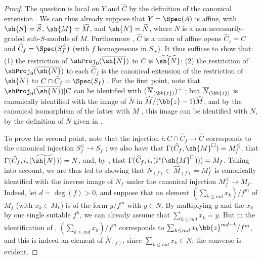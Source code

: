 \begin{proof}
\label{proof-II.8.13.3}
The question is local on $Y$ and $\widehat{C}$ by the definition of the canonical extension .
We can thus already suppose that $Y=\Spec(A)$ is affine, with $\sh{S}=\widetilde{S}$, $\sh{M}=\widetilde{M}$, and $\sh{N}=\widetilde{N}$, where $N$ is a non-necessarily-graded sub-$S$-module of $M$.
Furthermore , $\widehat{C}$ is a union of affine opens $\widehat{C}_z=C$ and $\widehat{C}_f=\Spec(S_f^\leq)$ (with $f$ homogeneous in $S_+$).
It thus suffices to show that: (1) the restriction of $\shProj_0(\overline{\sh{N}})$ to $C$ is $\widetilde{\sh{N}}$; (2) the restriction of $\shProj_0(\overline{\sh{N}})$ to each $\widehat{C}_f$ is the canonical extension of the restriction of $\sh{N}$ to $C\cap\widehat{C}_f=\Spec(S_f)$ .
For the first point, note that $\shProj_0(\overline{\sh{N}})|C$ can be identified with $(\overline{N}_{(\bb{z})})^\sim$ ;
but $\overline{N}_{(\bb{z})}$ is canonically identified  with the image of $\overline{N}$ in $\widehat{M}/(\bb{z}-1)\widehat{M}$, and by the canonical isomorphism of the latter with $M$ , this image can be identified with $N$, by the definition of $\overline{N}$ given in .

To prove the second point, note that the injection $i:C\cap\widehat{C}_f\to\widehat{C}$ corresponds to the canonical injection $S_f^\leq\to S_f$ ;
we also have that $\Gamma(\widehat{C}_f,\sh{M}^\square)=M_f^\leq$, that $\Gamma(\widehat{C}_f,i_*(\widetilde{\sh{N}}))=N$, and, by , that $\Gamma(\widehat{C}_f,i_*(i^*(\sh{M}^\square)))=M_f$.
Taking  into account, we are thus led to showing that $\overline{N}_{(f)}\subset\widehat{M}_{(f)}=M_f^\leq$ is canonically identified with the inverse image of $N_f$ under the canonical injection $M_f^\leq\to M_f$.
Indeed, let $d=\deg(f)>0$, and suppose that an element $(\sum_{k\leq md}x_k)/f^m$ of $M_f$ (with $x_k\in M_k$) is of the form $y/f^m$ with $y\in N$.
By multiplying $y$ and the $x_k$ by one single suitable $f^h$, we can already assume that $\sum_{k\leq md}x_k=y$.
But in the identification of , $(\sum_{k\leq md}x_k)/f^m$ corresponds to $\sum_{k\leq md}x_k\bb{z}^{md-k}/f^m$, and this is indeed an element of $\overline{N}_{(f)}$, since $\sum_{k\leq md}x_k\in N$;
the converse is evident.
\end{proof}

